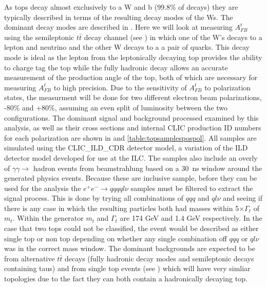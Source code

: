 As tops decay almost exclusively to a W and b (99.8\% of decays) they are typically described in terms of the resulting decay modes of the Ws. The dominant decay modes are described in . Here we will look at measuring $A_{FB}^{t}$ using the semileptonic $t\bar{t}$ decay channel (see ) in which one of the W's decays to a lepton and neutrino and the other W decays to a a pair of quarks. This decay mode is ideal as the lepton from the leptonically decaying top provides the ability to charge tag the top while the fully hadronic decay allows an accurate measurement of the production angle of the top, both of which are necessary for measuring $A_{FB}^{t}$ to high precision. Due to the sensitivity of $A_{FB}^{t}$ to polarization states, the measurment will be done for two different electron beam polarizations, -80\% and +80\%, assuming an even split of luminosity between the two configurations. The dominant signal and background processed examined by this analysis, as well as their cross sections and internal \ac{CLIC} production ID numbers for each polarization are shown in  and \ref{table:topsamplespospol}. All samples are simulated using the CLIC\_ILD\_CDR detector model, a variation of the ILD detector model developed for use at the ILC. The samples also include an overly of $\gamma\gamma\rightarrow$ hadron events from beamstrahlung based on a 30~ns window around the generated physics events. Because these are inclusive sample, before they can be used for the analysis the $e^+e^-\rightarrow qqqql\nu$ samples must be filtered to extract the signal process. This is done by trying all combinations of $qqq$ and $ql\nu$ and seeing if there is any case in which the resulting particles both had masses within 5$\times\Gamma_t$ of $m_t$. Within the generator $m_t$ and $\Gamma_t$ are 174 GeV and 1.4 GeV respectively. In the case that two tops could not be classified, the event would be described as either single top or non top depending on whether any single combination off $qqq$ or $ql\nu$ was in the correct mass window. The dominant backgrounds are expected to be from alternative $t\bar{t}$ decays (fully hadronic decay modes and semileptonic decays containing taus) and from single top events (see ) which will have very simliar topologies due to the fact they can both contain a hadronically decaying top.

